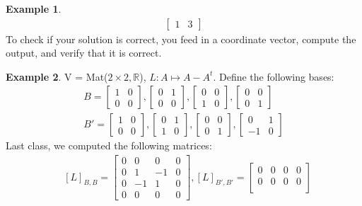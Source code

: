 \documentclass[a4paper, 12pt]{article}
\theoremstyle{definition}
\newtheorem{exmp}{Example}[section]
\theoremstyle{definition}
\theoremstyle{definition}
\theoremstyle{definition}
\begin{document}
{\begin{exmp}
\begin{align*}
\begin{bmatrix}
			1 & 3
		\end{bmatrix}
	\end{align*}
To check if your solution is correct, you feed in a coordinate vector, compute the output, and verify that it is correct. 
\end{exmp}
\begin{exmp}
	V = Mat($2 \times 2, \mathbb{R}$), $L: A \mapsto A - A^t$. Define the following bases: 
	\begin{align*}
		B = \begin{bmatrix}
			1 & 0 \\
			0 & 0 
		\end{bmatrix}, \begin{bmatrix}
			0 & 1 \\
			0 & 0 
		\end{bmatrix}, \begin{bmatrix}
			0 & 0 \\
			1 & 0 
		\end{bmatrix}, \begin{bmatrix}
			0 & 0 \\
			0 & 1 
		\end{bmatrix} \\
		B' = \begin{bmatrix}
			1 & 0 \\
			0 & 0 
		\end{bmatrix}, \begin{bmatrix}
			0 & 1 \\
			1 & 0 
		\end{bmatrix}, \begin{bmatrix}
			0 & 0 \\
			0 & 1 
		\end{bmatrix}, \begin{bmatrix}
			0 & 1 \\
			-1 & 0 
		\end{bmatrix}
	\end{align*}
	Last class, we computed the following matrices: 
	\begin{align*}
		& [L]_{B,B} = \begin{bmatrix}
			0 & 0 & 0 & 0 \\
			0 & 1 & -1 & 0 \\
			0 & -1 & 1 & 0 \\
			0 & 0 & 0 & 0 
		\end{bmatrix}, [L]_{B', B'} = \begin{bmatrix}
			0 & 0 & 0 & 0 \\
			0 & 0 & 0 & 0 \\

\end{bmatrix}
\end{align*}
\end{exmp}}
\end{document}
